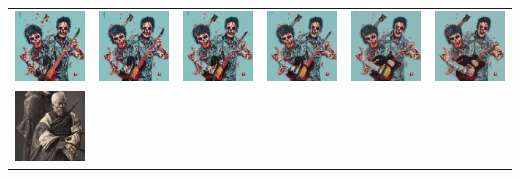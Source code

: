 \newpage

\begin{table}[!htb]
\centering
\begin{tabular}{c c@{}c@{}c@{}c@{}c}
    \includegraphics[width=0.155\linewidth]{chapter/appendix/def_imgs/guitar/g_0.png} & 
    \includegraphics[width=0.155\linewidth]{chapter/appendix/def_imgs/guitar/g_10.png} &
    \includegraphics[width=0.155\linewidth]{chapter/appendix/def_imgs/guitar/g_20.png} &
    \includegraphics[width=0.155\linewidth]{chapter/appendix/def_imgs/guitar/g_30.png} &
    \includegraphics[width=0.155\linewidth]{chapter/appendix/def_imgs/guitar/g_40.png} &
    \includegraphics[width=0.155\linewidth]{chapter/appendix/def_imgs/guitar/g_50.png} \\
    \includegraphics[width=0.155\linewidth]{chapter/appendix/def_imgs/japman/j_0.png} & 

\end{tabular}
\end{table}
